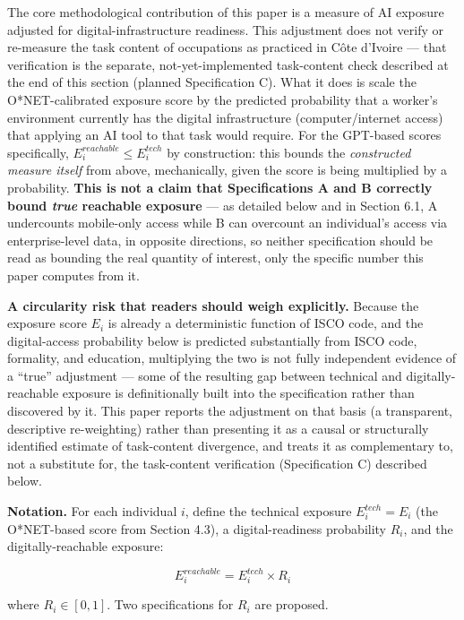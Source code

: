 \documentclass[
  11pt,
]{article}
\begin{document}
The core methodological contribution of this paper is a measure of AI
exposure adjusted for digital-infrastructure readiness. This adjustment
does not verify or re-measure the task content of occupations as
practiced in Côte d'Ivoire --- that verification is the separate,
not-yet-implemented task-content check described at the end of this
section (planned Specification C). What it does is scale the
O*NET-calibrated exposure score by the predicted probability that a
worker's environment currently has the digital infrastructure
(computer/internet access) that applying an AI tool to that task would
require. For the GPT-based scores specifically,
\(E_i^{reachable} \le E_i^{tech}\) by construction: this bounds the
\emph{constructed measure itself} from above, mechanically, given the
score is being multiplied by a probability. \textbf{This is not a claim
that Specifications A and B correctly bound \emph{true} reachable
exposure} --- as detailed below and in Section 6.1, A undercounts
mobile-only access while B can overcount an individual's access via
enterprise-level data, in opposite directions, so neither specification
should be read as bounding the real quantity of interest, only the
specific number this paper computes from it.

\textbf{A circularity risk that readers should weigh explicitly.}
Because the exposure score \(E_i\) is already a deterministic function
of ISCO code, and the digital-access probability below is predicted
substantially from ISCO code, formality, and education, multiplying the
two is not fully independent evidence of a ``true'' adjustment --- some
of the resulting gap between technical and digitally-reachable exposure
is definitionally built into the specification rather than discovered by
it. This paper reports the adjustment on that basis (a transparent,
descriptive re-weighting) rather than presenting it as a causal or
structurally identified estimate of task-content divergence, and treats
it as complementary to, not a substitute for, the task-content
verification (Specification C) described below.

\textbf{Notation.} For each individual \(i\), define the technical
exposure \(E_i^{tech} = E_i\) (the O*NET-based score from Section 4.3),
a digital-readiness probability \(R_i\), and the digitally-reachable
exposure:

\[E_i^{reachable} = E_i^{tech} \times R_i\]

where \(R_i \in [0, 1]\). Two specifications for \(R_i\) are proposed.
\end{document}

